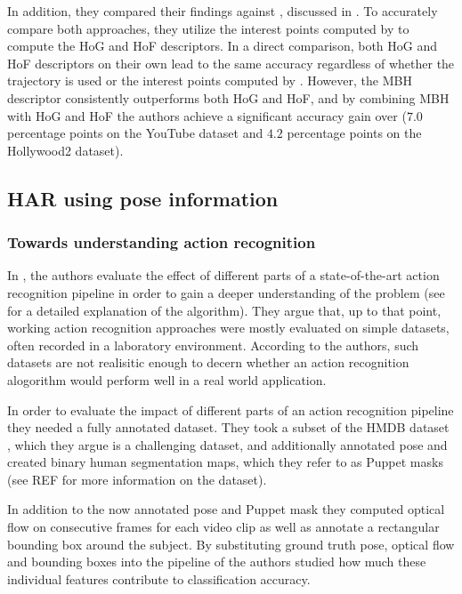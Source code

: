 In addition, they compared their findings against \cite{laptev_learning_2008}, discussed in .
To accurately compare both approaches, they utilize the interest points computed by \cite{laptev_learning_2008} to compute the HoG and HoF descriptors.
In a direct comparison, both HoG and HoF descriptors on their own lead to the same accuracy regardless of whether the trajectory is used or the interest points computed by \cite{laptev_learning_2008}.
However, the MBH descriptor consistently outperforms both HoG and HoF, and by combining MBH with HoG and HoF the authors achieve a significant accuracy gain over \cite{laptev_learning_2008} ($7.0$ percentage points on the YouTube dataset and $4.2$ percentage points on the Hollywood2 dataset).

\subsection{HAR using pose information}
\label{sec:jhuang-towards}
\subsubsection{Towards understanding action recognition}
In \cite{jhuang_towards_2013}, the authors evaluate the effect of different parts of a state-of-the-art action recognition pipeline \cite{wang_dense_2013} in order to gain a deeper understanding of the problem (see  for a detailed explanation of the algorithm).
They argue that, up to that point, working action recognition approaches were mostly evaluated on simple datasets, often recorded in a laboratory environment.
According to the authors, such datasets are not realisitic enough to decern whether an action recognition alogorithm would perform well in a real world application.

In order to evaluate the impact of different parts of an action recognition pipeline they needed a fully annotated dataset.
They took a subset of the HMDB dataset \cite{kuehne_hmdb:_2011}, which they argue is a challenging dataset, and additionally annotated pose and created binary human segmentation maps, which they refer to as Puppet masks (see REF for more information on the dataset). %

In addition to the now annotated pose and Puppet mask they computed optical flow on consecutive frames for each video clip as well as annotate a rectangular bounding box around the subject.
By substituting ground truth pose, optical flow and bounding boxes into the pipeline of \cite{wang_dense_2013} the authors studied how much these individual features contribute to classification accuracy.

